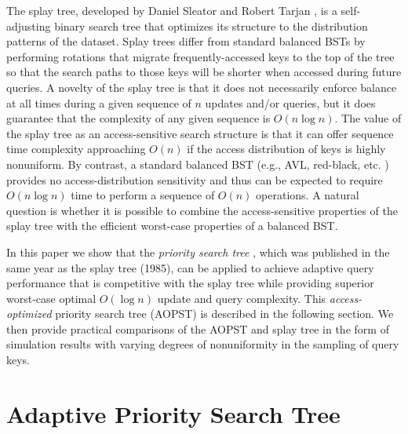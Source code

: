 \documentclass{article}
\begin{document}
The splay tree, developed by Daniel Sleator and Robert Tarjan \cite{splay}, is a self-adjusting \cite{selfadj} binary search tree that optimizes its structure to the distribution patterns of the dataset. Splay trees differ from standard balanced BSTs by performing rotations that migrate frequently-accessed keys to the top of the tree so that the search paths to those keys will be shorter when accessed during future queries. A novelty of the splay tree is that it does not necessarily enforce balance at all times during a given sequence of $n$ updates and/or queries, but it does guarantee that the complexity of any given sequence is $O(n\log n)$. The value of the splay tree as an access-sensitive search structure is that it can offer sequence time complexity approaching $O(n)$ if the access distribution of keys is highly nonuniform. By contrast, a standard balanced BST (e.g., AVL, red-black, etc. \cite{bst}) provides no access-distribution sensitivity and thus can be expected to require $O(n \log n)$ time to perform a sequence of $O(n)$ operations. A natural question is whether it is possible to combine the access-sensitive properties of the splay tree with the efficient worst-case properties of a balanced BST. 

In this paper we show that the {\em priority search tree} \cite{pst}, which was published in the same year as the splay tree (1985), can be applied to achieve adaptive query performance that is competitive with the splay tree while providing superior worst-case optimal $O(\log n)$ update and query complexity. This {\em access-optimized} priority search tree (AOPST) is described in the following section. We then provide practical comparisons of the AOPST and splay tree in the form of simulation results with varying degrees of nonuniformity in the sampling of query keys.


\section{Adaptive Priority Search Tree}
\end{document}

